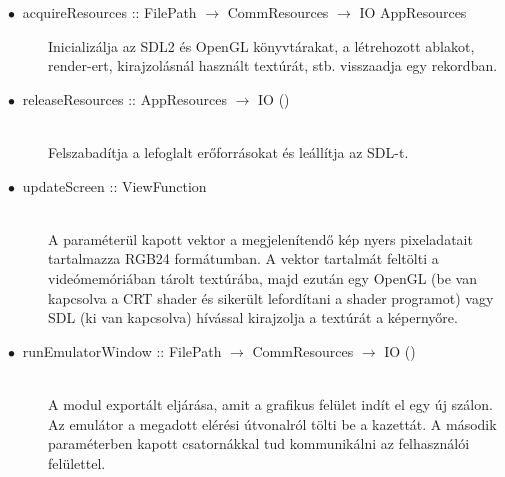 \begin{description}
	\item[$\bullet\:$ acquireResources :: FilePath $\rightarrow$ CommResources $\rightarrow$ IO AppResources] \hfill Inicializálja az SDL2 és OpenGL könyvtárakat, a létrehozott ablakot, render-ert, kirajzolásnál használt textúrát, stb. visszaadja egy rekordban.
	\item[$\bullet\:$ releaseResources :: AppResources $\rightarrow$ IO ()] \hfill \\
	Felszabadítja a lefoglalt erőforrásokat és leállítja az SDL-t.
	\item[$\bullet\:$ updateScreen :: ViewFunction] \hfill \\
	A paraméterül kapott vektor a megjelenítendő kép nyers pixeladatait tartalmazza RGB24 formátumban. A vektor tartalmát feltölti a videómemóriában tárolt textúrába, majd ezután egy OpenGL (be van kapcsolva a CRT shader és sikerült lefordítani a shader programot) vagy SDL (ki van kapcsolva) hívással kirajzolja a textúrát a képernyőre.
	\item[$\bullet\:$ runEmulatorWindow :: FilePath $\rightarrow$ CommResources $\rightarrow$ IO ()] \hfill \\
	A modul exportált eljárása, amit a grafikus felület indít el egy új szálon. Az emulátor a megadott elérési útvonalról tölti be a kazettát. A második paraméterben kapott csatornákkal tud kommunikálni az felhasználói felülettel.
\end{description}

